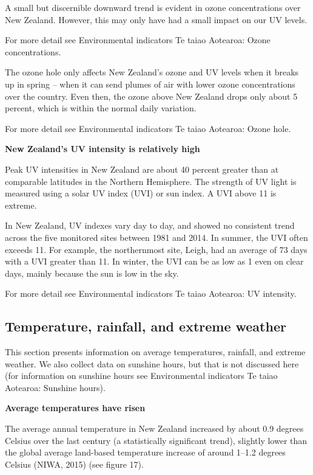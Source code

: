 \documentclass[11pt]{mfe-nzers} %
\begin{document}

A small but discernible downward trend is evident in ozone concentrations over New Zealand. However, this may only have had a small impact on our UV levels.

For more detail see Environmental indicators Te taiao Aotearoa: Ozone concentrations.

The ozone hole only affects New Zealand’s ozone and UV levels when it breaks up in spring – when it can send plumes of air with lower ozone concentrations over the country. Even then, the ozone above New Zealand drops only about 5 percent, which is within the normal daily variation.

For more detail see Environmental indicators Te taiao Aotearoa: Ozone hole.

\textbf{New Zealand’s UV intensity is relatively high}

Peak UV intensities in New Zealand are about 40 percent greater than at comparable latitudes in the Northern Hemisphere. The strength of UV light is measured using a solar UV index (UVI) or sun index. A UVI above 11 is extreme.

In New Zealand, UV indexes vary day to day, and showed no consistent trend across the five monitored sites between 1981 and 2014. In summer, the UVI often exceeds 11. For example, the northernmost site, Leigh, had an average of 73 days with a UVI greater than 11. In winter, the UVI can be as low as 1 even on clear days, mainly because the sun is low in the sky.

For more detail see Environmental indicators Te taiao Aotearoa: UV intensity.

\subsection{Temperature, rainfall, and extreme weather}

This section presents information on average temperatures, rainfall, and extreme weather. We also collect data on sunshine hours, but that is not discussed here (for information on sunshine hours see Environmental indicators Te taiao Aotearoa: Sunshine hours).

\textbf{Average temperatures have risen}

The average annual temperature in New Zealand increased by about 0.9 degrees Celsius over the last century (a statistically significant trend), slightly lower than the global average land-based temperature increase of around 1–1.2 degrees Celsius (NIWA, 2015) (see figure 17).
\end{document}
